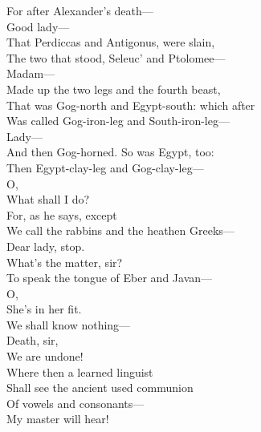 \documentclass[a4paper,oneside,12pt]{memoir}
\begin{document}
\begin{drama*}
\dolspeaks For after Alexander's death---\\
\mammonspeaks {} Good lady---\\
\dolspeaks That Perdiccas and Antigonus, were slain,\\
The two that stood, Seleuc' and Ptolomee---\\
\mammonspeaks Madam---\\
\dolspeaks {} Made up the two legs and the fourth beast,\\
That was Gog-north and Egypt-south: which after\\
Was called Gog-iron-leg and South-iron-leg---\\
\mammonspeaks Lady---\\
\dolspeaks {} And then Gog-horned. So was Egypt, too:\\
Then Egypt-clay-leg and Gog-clay-leg---\\
\mammonspeaks {} O,\\
What shall I do?\\
\dolspeaks {} For, as he says, except\\
We call the rabbins and the heathen Greeks---\\
\mammonspeaks Dear lady, stop.\\
\facespeaks {} What's the matter, sir?\\
\dolspeaks To speak the tongue of Eber and Javan---\\
\mammonspeaks {} O,\\
She's in her fit.\\
\dolspeaks {} We shall know nothing---\\
\facespeaks {} Death, sir,\\
We are undone!\\
\dolspeaks {} Where then a learned linguist\\
Shall see the ancient used communion\\
Of vowels and consonants---\\
\facespeaks {} My master will hear!\\

\end{drama*}
\end{document}
